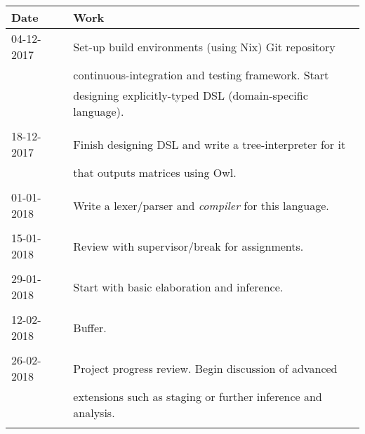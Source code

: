 \documentclass[11pt]{article}
\begin{document}
\vspace*{\fill}
\begin{table}[H]
\centering
\begin{tabular}{ll}
    \toprule

    Date & Work \\

    \midrule

    04-12-2017 & Set-up build environments (using Nix) Git repository          \\
               & continuous-integration and testing framework. Start           \\
               & designing explicitly-typed DSL (domain-specific language).    \\
                                                                               \\

    18-12-2017 & Finish designing DSL and write a tree-interpreter for it      \\
               & that outputs matrices using Owl.                              \\
                                                                               \\

    01-01-2018 & Write a lexer/parser and \emph{compiler} for this language.   \\
                                                                               \\

    15-01-2018 & Review with supervisor/break for assignments.                 \\
                                                                               \\

    29-01-2018 & Start with basic elaboration and inference.                   \\
                                                                               \\

    12-02-2018 & Buffer.                                                       \\
                                                                               \\

    26-02-2018 & Project progress review. Begin discussion of advanced         \\
               & extensions such as staging or further inference and analysis. \\
                                                                               \\


\end{tabular}
\end{table}
\end{document}
